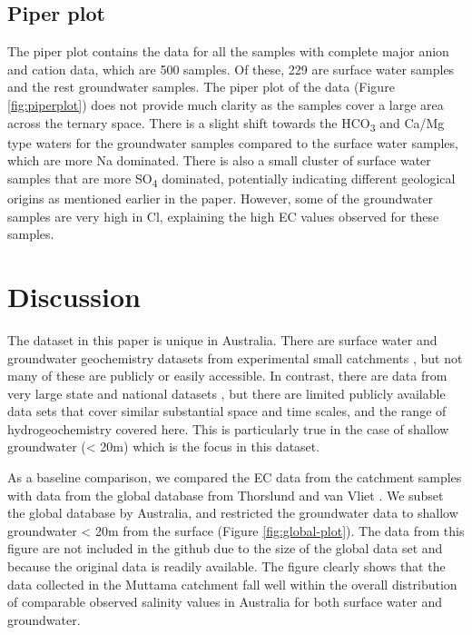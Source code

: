 \documentclass[, manuscript]{copernicus}
\begin{document}
\subsection{Piper plot}

The piper plot contains the data for all the samples with complete major
anion and cation data, which are 500 samples. Of these, 229 are surface
water samples and the rest groundwater samples. The piper plot of the
data (Figure \ref{fig:piperplot}) does not provide much clarity as the
samples cover a large area across the ternary space. There is a slight
shift towards the HCO\textsubscript{3} and Ca/Mg type waters for the
groundwater samples compared to the surface water samples, which are
more Na dominated. There is also a small cluster of surface water
samples that are more SO\textsubscript{4} dominated, potentially
indicating different geological origins as mentioned earlier in the
paper. However, some of the groundwater samples are very high in Cl,
explaining the high EC values observed for these samples.

\section{Discussion}

The dataset in this paper is unique in Australia. There are surface
water and groundwater geochemistry datasets from experimental small
catchments \citep[i.e.][]{Hughes2007, crosbie2007, Summerell2006}, but
not many of these are publicly or easily accessible. In contrast, there
are data from very large state and national datasets
\citep[i.e.][]{Jolly2001, thorslund_vanvliet2020}, but there are limited
publicly available data sets that cover similar substantial space and
time scales, and the range of hydrogeochemistry covered here. This is
particularly true in the case of shallow groundwater (\textless{} 20m)
which is the focus in this dataset.

As a baseline comparison, we compared the EC data from the catchment
samples with data from the global database from Thorslund and van Vliet
\citeyearpar{thorslund_vanvliet2020}. We subset the global database by
Australia, and restricted the groundwater data to shallow groundwater
\textless{} 20m from the surface (Figure \ref{fig:global-plot}). The
data from this figure are not included in the github due to the size of
the global data set and because the original data is readily available.
The figure clearly shows that the data collected in the Muttama
catchment fall well within the overall distribution of comparable
observed salinity values in Australia for both surface water and
groundwater.
\end{document}
